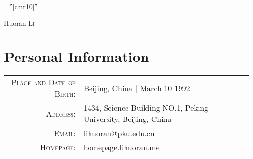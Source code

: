 \documentclass[a4paper,10pt]{article}
\begin{document}

\pagestyle{empty} %

\font\fb=''[cmr10]'' %

\par{\centering
		{\Huge Huoran \textsc{Li}
	}\bigskip\par}

\section{Personal Information}

\begin{tabular}{rl}
    \textsc{Place and Date of Birth:} & Beijing, China  | March 10 1992 \\
    \textsc{Address:}   & 1434, Science Building NO.1, Peking University, Beijing, China \\
    \textsc{Email:}     & \href{mailto:lihuoran@pku.edu.cn}{lihuoran@pku.edu.cn} \\
    \textsc{Homepage:}  & \href{http://homepage.lihuoran.me/}{homepage.lihuoran.me} \\
\end{tabular}
\end{document}
